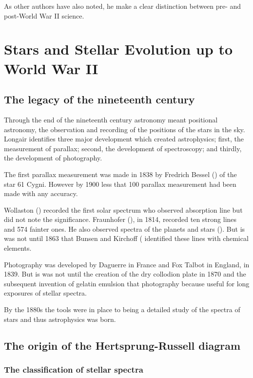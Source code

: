 As other authors have also noted, he make a clear distinction between
pre- and post-World War II science.


\section{Stars and Stellar Evolution up to World War II}

\subsection{The legacy of the nineteenth century}

Through the end of the nineteenth century astronomy
meant positional astronomy, the observation and recording of the
positions of the stars in the sky.  Longair identifies three major
development which created astrophysics; first, the measurement of
parallax; second, the development of spectroscopy; and thirdly, the
development of photography.

The first parallax measurement was made in 1838 by Fredrich
Bessel (\cite{Bessel1839}) of the star 61 Cygni. However by 1900 less
that 100 parallax measurement had been made with any accuracy.

Wollaston (\cite{Wollaston1802}) recorded the first solar spectrum who
observed absorption line but did not note the significance.
Fraunhofer (\cite{Fraunhofer1817}), in 1814, recorded ten strong lines
and 574 fainter ones. He also observed spectra of the planets and
stars (\cite{Fraunhofer1823}). But is was not until 1863 that Bunsen
and Kirchoff (\cite{Kirchoff1861} identified these lines with chemical
elements.

Photography was developed by Daguerre in France and Fox Talbot in
England, in 1839. But is was not until the creation of the dry
collodion plate in 1870 and the subsequent invention of gelatin
emulsion that photography because useful for long exposures of stellar
spectra.

By the 1880s the tools were in place to being a
detailed study of the spectra of stars and thus astrophysics was born.


\subsection{The origin of the Hertsprung-Russell diagram}

\subsubsection{The classification of stellar spectra}

